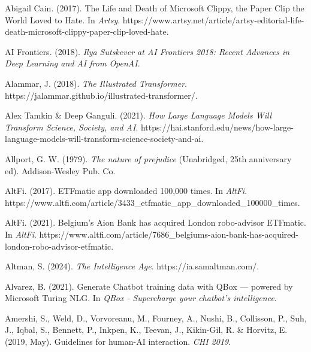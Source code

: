 \documentclass[
  letterpaper,
  DIV=11,
  numbers=noendperiod]{scrartcl}
\newlength{\cslhangindent}
\newenvironment{CSLReferences}[2] %
 {\begin{list}{}{%
  \setlength{\itemindent}{0pt}
  \setlength{\leftmargin}{0pt}
  \setlength{\parsep}{0pt}
  \ifodd #1
   \setlength{\leftmargin}{\cslhangindent}
   \setlength{\itemindent}{-1\cslhangindent}
  \fi
  \setlength{\itemsep}{#2\baselineskip}}}
 {\end{list}}
\begin{document}
\label{refs}
\begin{CSLReferences}{1}{0}
Abigail Cain. (2017). The {Life} and {Death} of {Microsoft Clippy}, the
{Paper Clip} the {World Loved} to {Hate}. In \emph{Artsy}.
https://www.artsy.net/article/artsy-editorial-life-death-microsoft-clippy-paper-clip-loved-hate.

AI Frontiers. (2018). \emph{Ilya {Sutskever} at {AI Frontiers} 2018:
{Recent Advances} in {Deep Learning} and {AI} from {OpenAI}}.

Alammar, J. (2018). \emph{The {Illustrated Transformer}}.
https://jalammar.github.io/illustrated-transformer/.

Alex Tamkin \& Deep Ganguli. (2021). \emph{How {Large Language Models
Will Transform Science}, {Society}, and {AI}}.
https://hai.stanford.edu/news/how-large-language-models-will-transform-science-society-and-ai.

Allport, G. W. (1979). \emph{The nature of prejudice} (Unabridged, 25th
anniversary ed). Addison-Wesley Pub. Co.

AltFi. (2017). {ETFmatic} app downloaded 100,000 times. In \emph{AltFi}.
https://www.altfi.com/article/3433\_etfmatic\_app\_downloaded\_100000\_times.

AltFi. (2021). Belgium's {Aion Bank} has acquired {London} robo-advisor
{ETFmatic}. In \emph{AltFi}.
https://www.altfi.com/article/7686\_belgiums-aion-bank-has-acquired-london-robo-advisor-etfmatic.

Altman, S. (2024). \emph{The {Intelligence Age}}.
https://ia.samaltman.com/.

Alvarez, B. (2021). Generate {Chatbot} training data with {QBox} ---
powered by {Microsoft Turing NLG}. In \emph{QBox - Supercharge your
chatbot's intelligence}.

Amershi, S., Weld, D., Vorvoreanu, M., Fourney, A., Nushi, B.,
Collisson, P., Suh, J., Iqbal, S., Bennett, P., Inkpen, K., Teevan, J.,
Kikin-Gil, R. \& Horvitz, E. (2019, May). Guidelines for human-{AI}
interaction. \emph{{CHI} 2019}.


\end{CSLReferences}
\end{document}
